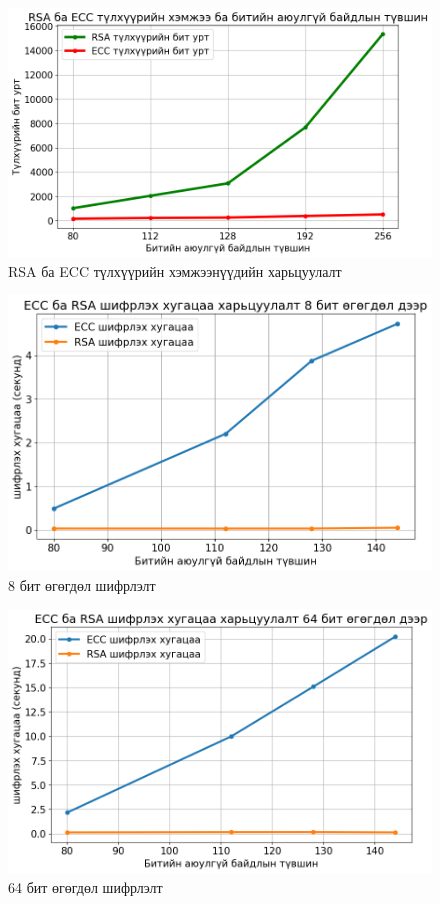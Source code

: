 	\begin{figure}[h]
		\centering
		\includegraphics[scale=0.6]{assets/graphs/keysize.png}
		\caption{RSA ба ECC түлхүүрийн хэмжээнүүдийн харьцуулалт}
		\label{fig:architecture}
	\end{figure}
	\begin{figure}[h]
		\centering
		\includegraphics[scale=0.65]{assets/graphs/1.png}
		\caption{8 бит өгөгдөл шифрлэлт}
		\label{fig:architecture}
	\end{figure}
	\begin{figure}[h]
		\centering
		\includegraphics[scale=0.65]{assets/graphs/2.png}
		\caption{64 бит өгөгдөл шифрлэлт}
		\label{fig:architecture}
	\end{figure}
